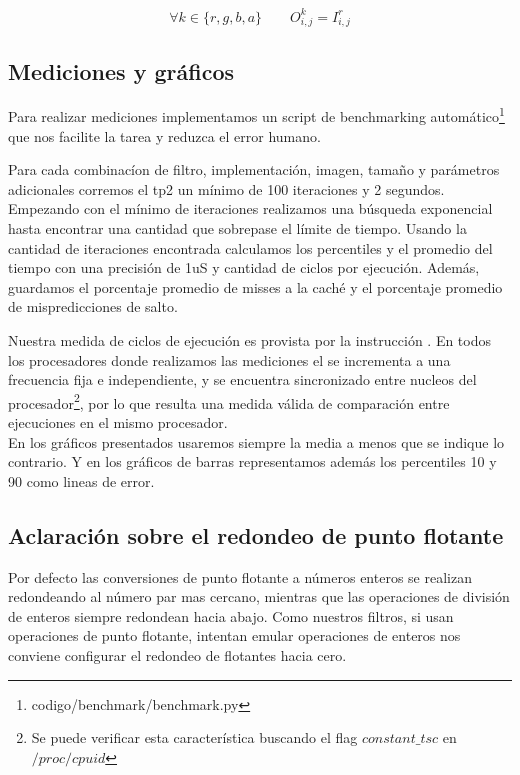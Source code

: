 $$\forall k \in \{r,g,b,a\} \qquad O^k_{i,j} = I^r_{i,j}$$

\subsection{Mediciones y gráficos}

Para realizar mediciones implementamos un script de benchmarking automático\footnote{codigo/benchmark/benchmark.py} que nos facilite la tarea y reduzca el error humano.

Para cada combinacíon de filtro, implementación, imagen, tamaño y parámetros adicionales corremos el tp2 un mínimo de 100 iteraciones y 2 segundos. Empezando con el mínimo de iteraciones realizamos una búsqueda exponencial hasta encontrar una cantidad que sobrepase el límite de tiempo. Usando la cantidad de iteraciones encontrada calculamos los percentiles y el promedio del tiempo con una precisión de 1uS y cantidad de ciclos por ejecución. Además, guardamos el porcentaje promedio de misses a la caché y el porcentaje promedio de mispredicciones de salto.

Nuestra medida de ciclos de ejecución es provista por la instrucción . En todos los procesadores donde realizamos las mediciones el  se incrementa a una frecuencia fija e independiente, y se encuentra sincronizado entre nucleos del procesador\footnote{Se puede verificar esta característica buscando el flag $constant\_tsc$ en $/proc/cpuid$}\textsuperscript{\cite[Volume 3B, Chapter 17.15]{intelsys}}, por lo que resulta una medida válida de comparación entre ejecuciones en el mismo procesador.
\\

En los gráficos presentados usaremos siempre la media a menos que se indique lo contrario. Y en los gráficos de barras representamos además los percentiles 10 y 90 como lineas de error.

\subsection{Aclaración sobre el redondeo de punto flotante}

Por defecto las conversiones de punto flotante a números enteros se realizan redondeando al número par mas cercano\textsuperscript{\cite[Volume 1, Chapter 10.2.3]{intelsys}}, mientras que las operaciones de división de enteros siempre redondean hacia abajo.
Como nuestros filtros, si usan operaciones de punto flotante, intentan emular operaciones de enteros nos conviene configurar el redondeo de flotantes hacia cero.

